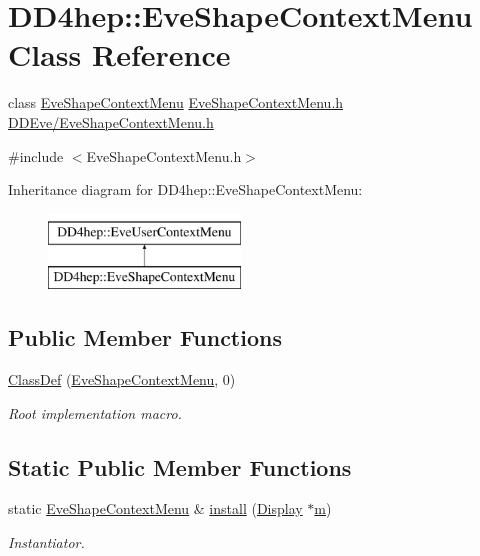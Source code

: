 \hypertarget{class_d_d4hep_1_1_eve_shape_context_menu}{}\section{D\+D4hep\+:\+:Eve\+Shape\+Context\+Menu Class Reference}
\label{class_d_d4hep_1_1_eve_shape_context_menu}


class \hyperlink{class_d_d4hep_1_1_eve_shape_context_menu}{Eve\+Shape\+Context\+Menu} \hyperlink{_eve_shape_context_menu_8h}{Eve\+Shape\+Context\+Menu.\+h} \hyperlink{_eve_shape_context_menu_8h}{D\+D\+Eve/\+Eve\+Shape\+Context\+Menu.\+h}  




{\ttfamily \#include $<$Eve\+Shape\+Context\+Menu.\+h$>$}

Inheritance diagram for D\+D4hep\+:\+:Eve\+Shape\+Context\+Menu\+:\begin{figure}[H]
\begin{center}
\leavevmode
\includegraphics[height=2.000000cm]{class_d_d4hep_1_1_eve_shape_context_menu}
\end{center}
\end{figure}
\subsection*{Public Member Functions}
\begin{DoxyCompactItemize}
\item 
\hyperlink{class_d_d4hep_1_1_eve_shape_context_menu_a265ec0c7f5d3dd2f384958e32e5c51d9}{Class\+Def} (\hyperlink{class_d_d4hep_1_1_eve_shape_context_menu}{Eve\+Shape\+Context\+Menu}, 0)
\begin{DoxyCompactList}\small\item\em Root implementation macro. \end{DoxyCompactList}\end{DoxyCompactItemize}
\subsection*{Static Public Member Functions}
\begin{DoxyCompactItemize}
\item 
static \hyperlink{class_d_d4hep_1_1_eve_shape_context_menu}{Eve\+Shape\+Context\+Menu} \& \hyperlink{class_d_d4hep_1_1_eve_shape_context_menu_adba9c9e666dc1c52775f59e1a423e3fa}{install} (\hyperlink{class_d_d4hep_1_1_display}{Display} $\ast$\hyperlink{_volumes_8cpp_a6fc379aaec47ce424b00d8ffda2a6c59}{m})
\begin{DoxyCompactList}\small\item\em Instantiator. \end{DoxyCompactList}\end{DoxyCompactItemize}
